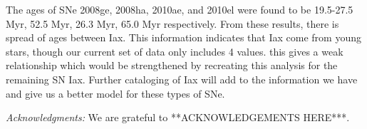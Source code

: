 \documentclass[preprint]{aastex}
\begin{document}
The ages of SNe 2008ge, 2008ha, 2010ae, and 2010el were found to be
19.5-27.5 Myr, 52.5 Myr, 26.3 Myr, 65.0 Myr respectively. 
From these results, there is spread of ages between Iax. 
This information indicates that Iax come from young stars, though
our current set of data only includes 4 values.
this gives a weak relationship which would be strengthened by recreating this analysis for the remaining SN Iax.
Further cataloging of Iax will add to the information we have and give us a better model for these types of SNe.  


{\it Acknowledgments:} We are grateful to **ACKNOWLEDGEMENTS HERE***.

%

{}
%
%
\end{document}
